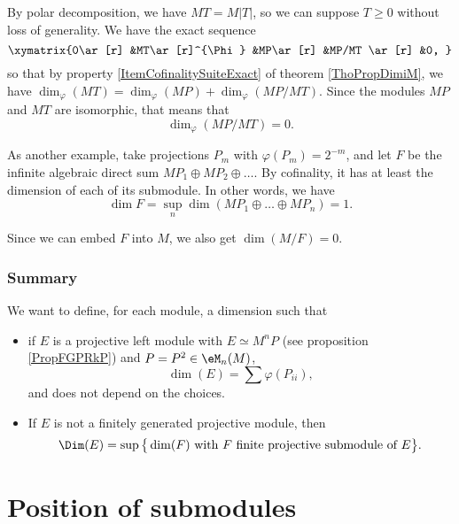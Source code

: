 By polar decomposition, we have $MT=M| T |$, so we can suppose $T\geq 0$ without loss of generality. We have the exact sequence
\[ 
	\xymatrix{%
   0\ar[r] 	&MT\ar[r]^{\Phi}	&MP\ar[r]	&MP/MT \ar[r]	&0,	
}
\]
so that by property \ref{ItemCofinalitySuiteExact} of theorem \ref{ThoPropDimiM}, we have $\dim_{\varphi}(MT)=\dim_{\varphi}(MP)+\dim_{\varphi}(MP/MT)$. Since the modules $MP$ and $MT$ are isomorphic, that means that 
\[ 
	\dim_{\varphi}(MP/MT)=0.
\]

As another example, take projections $P_m$ with $\varphi(P_m)=2^{-m}$, and let $F$ be the infinite algebraic direct sum $MP_1\oplus MP_2\oplus\ldots$. By cofinality, it has at least the dimension of each of its submodule. In other words, we have
\[ 
	\dim F=\sup_n\dim(MP_1\oplus\ldots\oplus MP_n)=1.
\]

Since we can embed $F$ into $M$, we also get $\dim(M/F)=0$.

					\subsubsection{Summary}

We want to define, for each module, a dimension such that
\begin{itemize}
\item if $E$ is a projective left module with $E\simeq M^nP$ (see proposition \ref{PropFGPRkP}) and $P=P^2\in\eM_n(M)$,
\[ 
	\dim(E)=\sum \varphi(P_{ii}),
\]
and does not depend on the choices.
\item If $E$ is not a finitely generated projective module, then
\begin{equation}		\label{DefDimAvecGrandD}
	\Dim(E)=\sup\big\{  \dim(F)\text{ with $F$ finite projective submodule of $E$} \big\}.
\end{equation}
\end{itemize}

					\section{Position of submodules}

